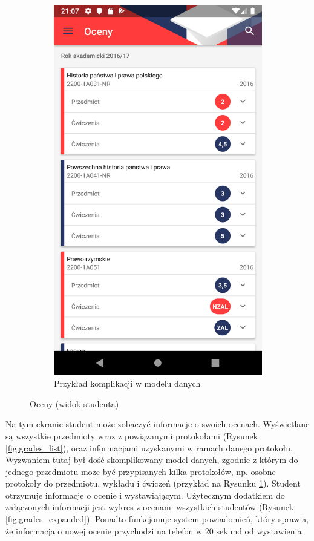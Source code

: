 \documentclass{pracamgr}
\begin{document}
\begin{figure}[p]
\begin{subfigure}[t]{0.3\textwidth}
		\includegraphics[width=\textwidth]{img/grades_complicated.png}
		\caption{Przykład komplikacji w modelu danych}
		\label{fig:grades_complicated}
	\end{subfigure}
	\caption{Oceny (widok studenta)}\label{fig:grades}
	\medskip
\end{figure}

Na tym ekranie student może zobaczyć informacje o swoich ocenach. Wyświetlane są
wszystkie przedmioty wraz z powiązanymi protokołami (Rysunek \ref{fig:grades_list}), oraz informacjami uzyskanymi
w ramach danego protokołu. Wyzwaniem tutaj był dość skomplikowany model 
danych, zgodnie z którym
do jednego przedmiotu może być przypisanych kilka protokołów, np. osobne
protokoły do przedmiotu, wykładu i ćwiczeń (przykład na Rysunku \ref{fig:grades_complicated}). Student otrzymuje informacje o ocenie
i wystawiającym. Użytecznym dodatkiem do załączonych informacji jest wykres z ocenami
wszystkich studentów (Rysunek \ref{fig:grades_expanded}). Ponadto funkcjonuje system powiadomień, który sprawia, że
informacja o nowej ocenie przychodzi na telefon w 20 sekund od wystawienia.
\end{document}
